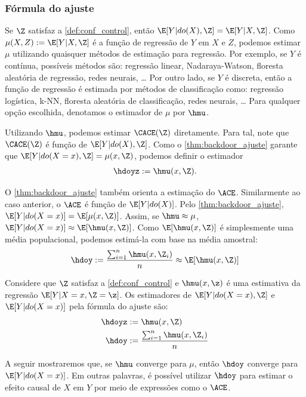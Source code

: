 \subsubsection{Fórmula do ajuste}

Se $\Z$ satisfaz a \cref{def:conf_control}, então
$\E[Y|do(X),\Z] = \E[Y|X,\Z]$.
Como $\mu(X,Z) := \E[Y|X,\Z]$ é 
a função de regressão de $Y$ em $X$ e $Z$,
podemos estimar $\mu$ utilizando 
quaisquer métodos de estimação para regressão.
Por exemplo, se $Y$ é contínua,
possíveis métodos são:
regressão linear, Nadaraya-Watson, 
floresta aleatória de regressão, redes neurais, \ldots
Por outro lado, se $Y$ é discreta,
então a função de regressão é estimada por
métodos de classificação como:
regressão logística, k-NN, 
floresta aleatória de classificação,
redes neurais, \ldots
Para qualquer opção escolhida,
denotamos o estimador de $\mu$ por $\hmu$.

Utilizando $\hmu$, podemos estimar
$\CACE(\Z)$ diretamente.
Para tal, note que $\CACE(\Z)$ é
função de $\E[Y|do(X),\Z]$.
Como o \cref{thm:backdoor_ajuste} garante que
$\E[Y|do(X=x),\Z] = \mu(x,\Z)$,
podemos definir o estimador
\begin{align*}
 \hdoyz := \hmu(x,\Z).
\end{align*}

O \cref{thm:backdoor_ajuste} também 
orienta a estimação do $\ACE$. 
Similarmente ao caso anterior,
o $\ACE$ é função de $\E[Y|do(X)]$.
Pelo \cref{thm:backdoor_ajuste},
$\E[Y|do(X=x)] = \E[\mu(x,\Z)]$.
Assim, se $\hmu \approx \mu$,
$\E[Y|do(X=x)] \approx \E[\hmu(x,\Z)]$.
Como $\E[\hmu(x,\Z)]$ é simplesmente 
uma média populacional,
podemos estimá-la com base
na média amostral:
\begin{align*}
 \hdoy := \frac{\sum_{i=1}^n \hmu(x,\Z_i)}{n} \approx \E[\hmu(x,\Z)]
\end{align*}

\begin{definition}
 \label{def:ajuste}
 Considere que $\Z$ satisfaz a \cref{def:conf_control} e
 $\hmu(x,\z)$ é uma estimativa 
 da regressão $\E[Y|X=x,\Z=\z]$.
 Os estimadores de 
 $\E[Y|do(X=x),\Z]$ e
 $\E[Y|do(X=x)]$ pela
 fórmula do ajuste são:
\begin{align*}
 \hdoyz &:= \hmu(x,\Z) \\
 \hdoy &:= \frac{\sum_{i=1}^n \hmu(x,\Z_i)}{n}
\end{align*}
\end{definition}

A seguir mostraremos que,
se $\hmu$ converge para $\mu$, então
$\hdoy$ converge para $\E[Y|do(X=x)]$.
Em outras palavras, é possível utilizar
$\hdoy$ para estimar o efeito causal de $X$ em $Y$
por meio de expressões como o $\ACE$.

